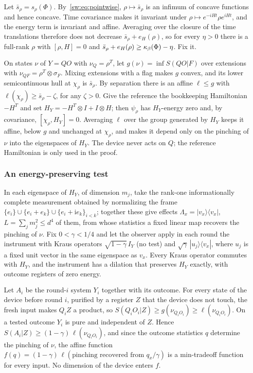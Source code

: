 Let $\bar s_\rho=s_\rho(\Phi)$. By~\eqref{sw:eq:pointwise}, $\rho\mapsto\bar s_\rho$ is an infimum of concave functions and hence concave. Time covariance makes it invariant under $\rho\mapsto e^{-iHt}\rho e^{iHt}$, and the energy term is invariant and affine. Averaging over the closure of the time translations therefore does not decrease $\bar s_\rho+e_H(\rho)$, so for every $\eta>0$ there is a full-rank $\rho$ with $[\rho,H]=0$ and $\bar s_\rho+e_H(\rho)\ge\kappa_\beta(\Phi)-\eta$. Fix it.

On states $\nu$ of $Y=QO$ with $\nu_Q=\rho^T$, let $g(\nu)=\inf S(QO|F)$ over extensions with $\nu_{QF}=\rho^T\otimes\sigma_F$. Mixing extensions with a flag makes $g$ convex, and its lower semicontinuous hull at $\chi_\rho$ is $\bar s_\rho$. By separation there is an affine $\ell\le g$ with $\ell(\chi_\rho)\ge\bar s_\rho-\zeta$, for any $\zeta>0$. Give the reference the bookkeeping Hamiltonian $-H^T$ and set $H_Y=-H^T\otimes I+I\otimes H$; then $\psi_\rho$ has $H_Y$-energy zero and, by covariance, $[\chi_\rho,H_Y]=0$. Averaging $\ell$ over the group generated by $H_Y$ keeps it affine, below $g$ and unchanged at $\chi_\rho$, and makes it depend only on the pinching of $\nu$ into the eigenspaces of $H_Y$. The device never acts on $Q$; the reference Hamiltonian is only used in the proof.

\subsubsection{An energy-preserving test}

In each eigenspace of $H_Y$, of dimension $m_j$, take the rank-one informationally complete measurement obtained by normalizing the frame $\{e_i\}\cup\{e_i+e_k\}\cup\{e_i+\mathrm ie_k\}_{i<k}$; together these give effects $\Lambda_x=|v_x\rangle\langle v_x|$, $L=\sum_jm_j^2\le d^4$ of them, from whose statistics a fixed linear map recovers the pinching of $\nu$. Fix $0<\gamma<1/4$ and let the observer apply in each round the instrument with Kraus operators $\sqrt{1-\gamma}\,I_Y$ (no test) and $\sqrt\gamma\,|u_j\rangle\langle v_x|$, where $u_j$ is a fixed unit vector in the same eigenspace as $v_x$. Every Kraus operator commutes with $H_Y$, and the instrument has a dilation that preserves $H_Y$ exactly, with outcome registers of zero energy.

Let $A_i$ be the round-$i$ system $Y_i$ together with its outcome. For every state of the device before round $i$, purified by a register $Z$ that the device does not touch, the fresh input makes $Q_iZ$ a product, so $S(Q_iO_i|Z)\ge g(\nu_{Q_iO_i})\ge\ell(\nu_{Q_iO_i})$. On a tested outcome $Y_i$ is pure and independent of $Z$. Hence $S(A_i|Z)\ge(1-\gamma)\,\ell(\nu_{Q_iO_i})$, and since the outcome statistics $q$ determine the pinching of $\nu$, the affine function $f(q)=(1-\gamma)\,\ell(\text{pinching recovered from }q_x/\gamma)$ is a min-tradeoff function for every input. No dimension of the device enters $f$.

